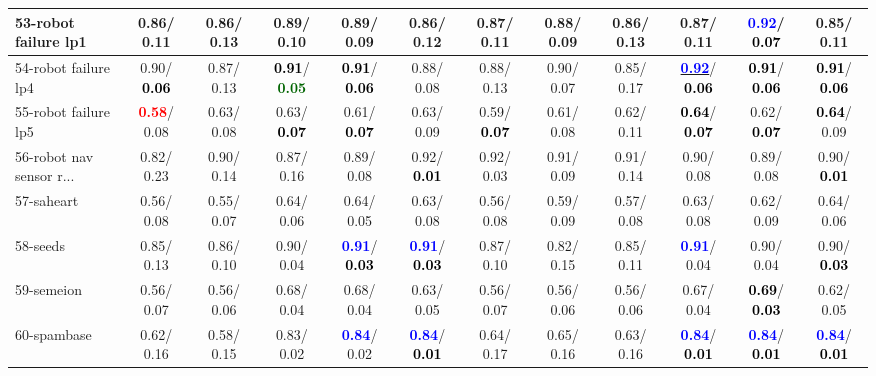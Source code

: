 \begin{table}[h]
\begin{center}
{\begin{tabular}{lc|c|c|c|c|c|c|c|c|c|c}
53-robot failure lp1 &   0.86/  0.11 &   0.86/  0.13 &   0.89/  0.10 &   0.89/  0.09 &   0.86/  0.12 &   0.87/  0.11 &   0.88/  0.09 &   0.86/  0.13 &   0.87/  0.11 & \textcolor{blue}{\textbf{  0.92}}/\textcolor{black}{\textbf{  0.07}} &   0.85/  0.11 \\ \hline
54-robot failure lp4 &   0.90/\textcolor{black}{\textbf{  0.06}} &   0.87/  0.13 & \textcolor{black}{\textbf{  0.91}}/\textcolor{darkgreen}{\textbf{  0.05}} & \textcolor{black}{\textbf{  0.91}}/\textcolor{black}{\textbf{  0.06}} &   0.88/  0.08 &   0.88/  0.13 &   0.90/  0.07 &   0.85/  0.17 & \underline{\textcolor{blue}{\textbf{  0.92}}}/\textcolor{black}{\textbf{  0.06}} & \textcolor{black}{\textbf{  0.91}}/\textcolor{black}{\textbf{  0.06}} & \textcolor{black}{\textbf{  0.91}}/\textcolor{black}{\textbf{  0.06}} \\
55-robot failure lp5 & \textcolor{red}{\textbf{  0.58}}/  0.08 &   0.63/  0.08 &   0.63/\textcolor{black}{\textbf{  0.07}} &   0.61/\textcolor{black}{\textbf{  0.07}} &   0.63/  0.09 &   0.59/\textcolor{black}{\textbf{  0.07}} &   0.61/  0.08 &   0.62/  0.11 & \textcolor{black}{\textbf{  0.64}}/\textcolor{black}{\textbf{  0.07}} &   0.62/\textcolor{black}{\textbf{  0.07}} & \textcolor{black}{\textbf{  0.64}}/  0.09 \\
56-robot nav sensor r... &   0.82/  0.23 &   0.90/  0.14 &   0.87/  0.16 &   0.89/  0.08 &   0.92/\textcolor{black}{\textbf{  0.01}} &   0.92/  0.03 &   0.91/  0.09 &   0.91/  0.14 &   0.90/  0.08 &   0.89/  0.08 &   0.90/\textcolor{black}{\textbf{  0.01}} \\
57-saheart &   0.56/  0.08 &   0.55/  0.07 &   0.64/  0.06 &   0.64/  0.05 &   0.63/  0.08 &   0.56/  0.08 &   0.59/  0.09 &   0.57/  0.08 &   0.63/  0.08 &   0.62/  0.09 &   0.64/  0.06 \\
58-seeds &   0.85/  0.13 &   0.86/  0.10 &   0.90/  0.04 & \textcolor{blue}{\textbf{  0.91}}/\textcolor{black}{\textbf{  0.03}} & \textcolor{blue}{\textbf{  0.91}}/\textcolor{black}{\textbf{  0.03}} &   0.87/  0.10 &   0.82/  0.15 &   0.85/  0.11 & \textcolor{blue}{\textbf{  0.91}}/  0.04 &   0.90/  0.04 &   0.90/\textcolor{black}{\textbf{  0.03}} \\
59-semeion &   0.56/  0.07 &   0.56/  0.06 &   0.68/  0.04 &   0.68/  0.04 &   0.63/  0.05 &   0.56/  0.07 &   0.56/  0.06 &   0.56/  0.06 &   0.67/  0.04 & \textcolor{black}{\textbf{  0.69}}/\textcolor{black}{\textbf{  0.03}} &   0.62/  0.05 \\
60-spambase &   0.62/  0.16 &   0.58/  0.15 &   0.83/  0.02 & \textcolor{blue}{\textbf{  0.84}}/  0.02 & \textcolor{blue}{\textbf{  0.84}}/\textcolor{black}{\textbf{  0.01}} &   0.64/  0.17 &   0.65/  0.16 &   0.63/  0.16 & \textcolor{blue}{\textbf{  0.84}}/\textcolor{black}{\textbf{  0.01}} & \textcolor{blue}{\textbf{  0.84}}/\textcolor{black}{\textbf{  0.01}} & \textcolor{blue}{\textbf{  0.84}}/\textcolor{black}{\textbf{  0.01}} \\ \hline

\end{tabular}}
\end{center}
\end{table}
